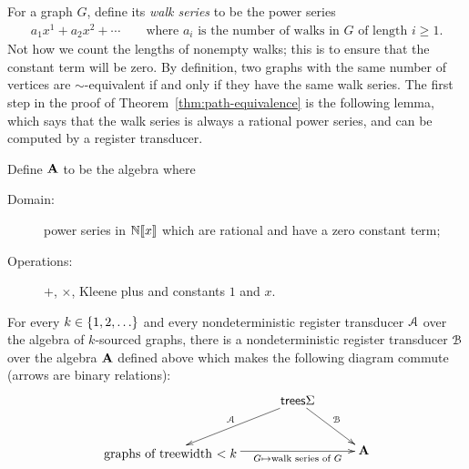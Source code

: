 For a graph $G$, define its \emph{walk series} to be the power series 
\begin{align*}
  a_1 x^1 + a_2x^2 + \cdots \qquad \text{where $a_i$ is the number of walks in $G$ of length $i \ge 1$.}
\end{align*}
Not how we count the lengths of nonempty walks; this is to ensure that the constant term will be zero.
By definition, two graphs with the same number of vertices are $\sim$-equivalent if and only if they have the same walk series. 
The first step in the proof of Theorem~\ref{thm:path-equivalence} is the following lemma, which says that the walk series is always a  rational power series, and can be computed by a register transducer.
\begin{lemma}\label{lem:compute-power-series}    
    Define  $\mathbf{A}$ to be the  algebra where
    \begin{description}
        \item[Domain:]power series in $\mathbb N [\![x]\!]$ which are rational and have a  zero constant term;
        \item[Operations:] $+$, $\times$, Kleene plus and constants $1$ and $x$.
    \end{description}
    For every $k \in \{1,2,\ldots\}$ and every nondeterministic register transducer ${{\mathcal A}}$ over the algebra of $k$-sourced graphs, there is a  nondeterministic register transducer ${\mathcal B}$ over the algebra  $\mathbf{A}$ defined above which makes the following diagram commute (arrows are binary relations):
    \begin{align*}
    \xymatrix@C=1cm{
       &  \trees \Sigma   
        \ar[dr]^{\Bb}
        \ar[dl]_{\Aa} \\
        \txt{graphs of
        treewidth $< k$} \ar[rr]_-{G \mapsto \text{walk series of $G$}}& & \aalg
    }
    \end{align*}
\end{lemma}
